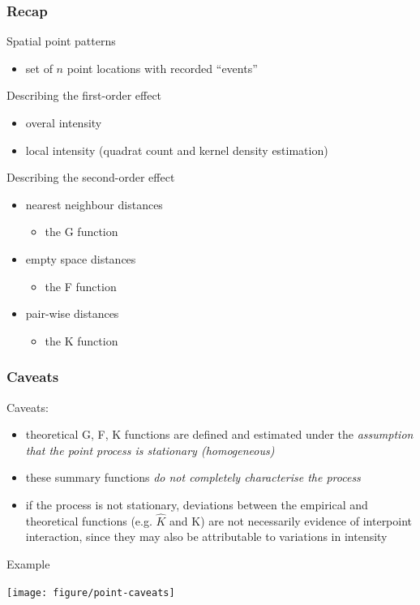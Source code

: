 \documentclass[10pt]{beamer}\usepackage[]{graphicx}\usepackage[]{color}
\newenvironment{knitrout}{}{} %
\newcommand{\bitemize}{\begin{itemize}}
\newcommand{\eitemize}{\end{itemize}}
\newcommand{\bblock}{\begin{block}}
\newcommand{\eblock}{\end{block}}
\begin{document}
\begin{frame}
\frametitle{Recap}

\bblock{Spatial point patterns}
\bitemize
\item set of $n$ point locations with recorded ``events''
\eitemize
\eblock

\bblock{Describing the first-order effect}
\bitemize
\item overal intensity
\item local intensity (quadrat count and kernel density estimation)
\eitemize
\eblock


\bblock{Describing the second-order effect}

\bitemize
\item nearest neighbour distances 
\bitemize
\item the G function
\eitemize

\item empty space distances 
\bitemize
\item the F function
\eitemize

\item pair-wise distances
\bitemize
\item the K function
\eitemize

\eitemize
\eblock

\end{frame}
\begin{frame}
\frametitle{Caveats}

\bblock{{Caveats:}}
\begin{itemize}
\item theoretical G, F, K functions are defined and estimated under the {\it assumption that the point process is stationary (homogeneous)}
\item these summary functions {\it do not completely characterise the process}
\item if the process is not stationary, deviations between the empirical and theoretical functions
(e.g. $\hat{K}$ and K) are not necessarily evidence of interpoint interaction, since they may also be attributable to variations in intensity
\end{itemize}
\eblock
\bblock{Example}
\vspace{-1cm}
\begin{knitrout}
\color{fgcolor}

{\centering \texttt{[image: figure/point-caveats]} 

}



\end{knitrout}

\eblock
\end{frame}
\end{document}
